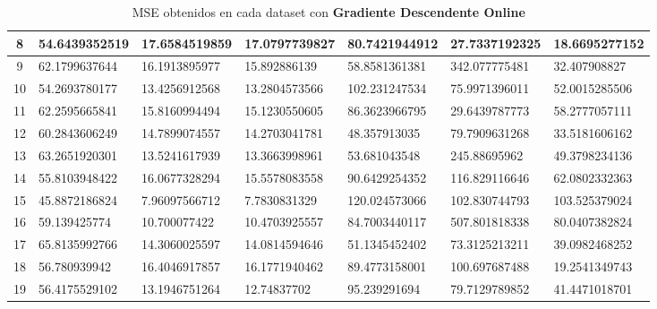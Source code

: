 \documentclass[spanish, fleqn]{article}
\begin{document}
\begin{enumerate}
\begin{table}[!htbp]
\begin{tabular}{|c|l|l|l|l|l|l|}
8  & 54.6439352519 & 17.6584519859 & 17.0797739827 & 80.7421944912 & 27.7337192325 & 18.6695277152 \\ \hline
9  & 62.1799637644 & 16.1913895977 & 15.892886139 & 58.8581361381 & 342.077775481 & 32.407908827 \\ \hline
10 & 54.2693780177 & 13.4256912568 & 13.2804573566 & 102.231247534 & 75.9971396011 & 52.0015285506 \\ \hline
11 & 62.2595665841 & 15.8160994494 & 15.1230550605 & 86.3623966795 & 29.6439787773 & 58.2777057111 \\ \hline
12 & 60.2843606249 & 14.7899074557 & 14.2703041781 & 48.357913035 & 79.7909631268 & 33.5181606162 \\ \hline
13 & 63.2651920301 & 13.5241617939 & 13.3663998961 & 53.681043548 & 245.88695962 & 49.3798234136 \\ \hline
14 & 55.8103948422 & 16.0677328294 & 15.5578083558 & 90.6429254352 & 116.829116646 & 62.0802332363 \\ \hline
15 & 45.8872186824 & 7.96097566712 & 7.7830831329 & 120.024573066 & 102.830744793 & 103.525379024 \\ \hline
16 & 59.139425774 & 10.700077422 & 10.4703925557 & 84.7003440117 & 507.801818338 & 80.0407382824 \\ \hline
17 & 65.8135992766 & 14.3060025597 & 14.0814594646 & 51.1345452402 & 73.3125213211 & 39.0982468252 \\ \hline
18 & 56.780939942 & 16.4046917857 & 16.1771940462 & 89.4773158001 & 100.697687488 & 19.2541349743 \\ \hline
19 & 56.4175529102 & 13.1946751264 & 12.74837702 & 95.239291694 & 79.7129789852 & 41.4471018701 \\ \hline
\end{tabular}
\caption{MSE obtenidos en cada dataset con \textbf{Gradiente Descendente Online}}
\label{my-label}
\end{table}



\end{enumerate}
\end{document}
